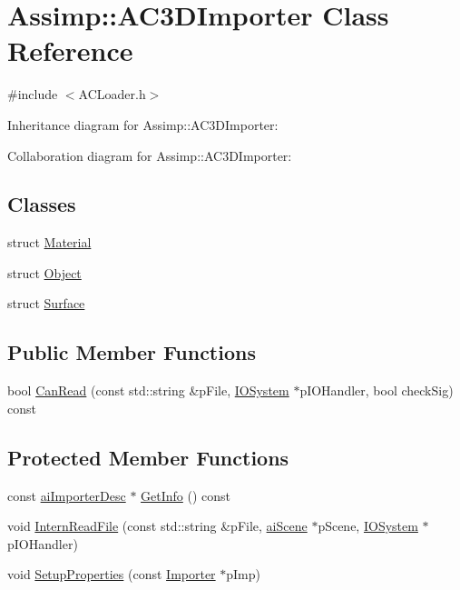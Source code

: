 \hypertarget{class_assimp_1_1_a_c3_d_importer}{\section{Assimp\+:\+:A\+C3\+D\+Importer Class Reference}
\label{class_assimp_1_1_a_c3_d_importer}
}


{\ttfamily \#include $<$A\+C\+Loader.\+h$>$}



Inheritance diagram for Assimp\+:\+:A\+C3\+D\+Importer\+:


Collaboration diagram for Assimp\+:\+:A\+C3\+D\+Importer\+:
\subsection*{Classes}
\begin{DoxyCompactItemize}
\item 
struct \hyperlink{struct_assimp_1_1_a_c3_d_importer_1_1_material}{Material}
\item 
struct \hyperlink{struct_assimp_1_1_a_c3_d_importer_1_1_object}{Object}
\item 
struct \hyperlink{struct_assimp_1_1_a_c3_d_importer_1_1_surface}{Surface}
\end{DoxyCompactItemize}
\subsection*{Public Member Functions}
\begin{DoxyCompactItemize}
\item 
bool \hyperlink{class_assimp_1_1_a_c3_d_importer_aefb82b11143ea7809b26253cdb84f8be}{Can\+Read} (const std\+::string \&p\+File, \hyperlink{class_assimp_1_1_i_o_system}{I\+O\+System} $\ast$p\+I\+O\+Handler, bool check\+Sig) const 
\end{DoxyCompactItemize}
\subsection*{Protected Member Functions}
\begin{DoxyCompactItemize}
\item 
const \hyperlink{structai_importer_desc}{ai\+Importer\+Desc} $\ast$ \hyperlink{class_assimp_1_1_a_c3_d_importer_ac77b6db917189f7d61bdde0d124c1f29}{Get\+Info} () const 
\item 
void \hyperlink{class_assimp_1_1_a_c3_d_importer_a88b27495efcf754f3dda7e4177aff902}{Intern\+Read\+File} (const std\+::string \&p\+File, \hyperlink{structai_scene}{ai\+Scene} $\ast$p\+Scene, \hyperlink{class_assimp_1_1_i_o_system}{I\+O\+System} $\ast$p\+I\+O\+Handler)
\item 
void \hyperlink{class_assimp_1_1_a_c3_d_importer_a59bf78ed30aa9de6e16d6ecfe5b3d1ad}{Setup\+Properties} (const \hyperlink{class_assimp_1_1_importer}{Importer} $\ast$p\+Imp)
\end{DoxyCompactItemize}
